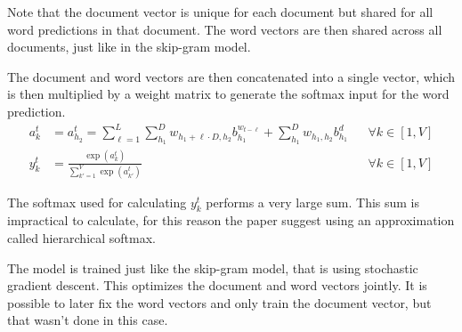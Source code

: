 Note that the document vector is unique for each document but shared for all word predictions in that document. The word vectors are then shared across all documents, just like in the skip-gram model.

The document and word vectors are then concatenated into a single vector, which is then multiplied by a weight matrix to generate the softmax input for the word prediction.
\begin{equation}
\begin{aligned}
a_{k}^t &= a_{h_2}^t = \sum_{\ell=1}^L \sum_{h_1}^D w_{h_1 + \ell \cdot D, h_2} b_{h_1}^{w_{t - \ell}} + \sum_{h_1}^D w_{h_1, h_2} b_{h_1}^d && \forall k \in [1, V] \\
y_{k}^t &= \frac{\exp(a_k^t)}{\sum_{k'=1}^V \exp(a_{k'}^t)} && \forall k \in [1, V]
\end{aligned}
\end{equation}

The softmax used for calculating $y_{k}^t$ performs a very large sum. This sum is impractical to calculate, for this reason the paper \cite{doc2vec} suggest using an approximation called hierarchical softmax.

The model is trained just like the skip-gram model, that is using stochastic gradient descent. This optimizes the document and word vectors jointly. It is possible to later fix the word vectors and only train the document vector, but that wasn't done in this case.
